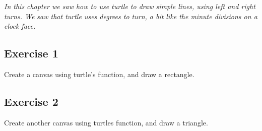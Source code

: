 \emph{In this chapter we saw how to use turtle to draw simple lines, using left and right turns.  We saw that turtle uses degrees to turn, a bit like the minute divisions on a clock face.}

\subsection*{Exercise 1}
Create a canvas using turtle's  function, and draw a rectangle.

\subsection*{Exercise 2}
Create another canvas using turtles  function, and draw a triangle.

\newpage
